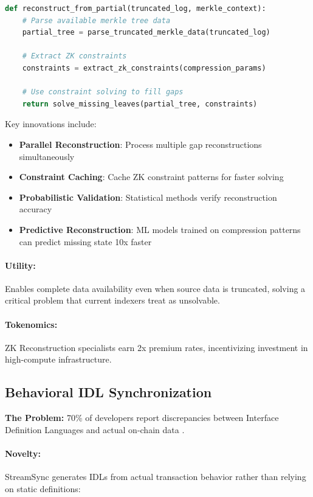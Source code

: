 \documentclass[12pt,a4paper]{article}
\begin{document}
\begin{lstlisting}[language=Python, caption=State Reconstruction Algorithm]
def reconstruct_from_partial(truncated_log, merkle_context):
    # Parse available merkle tree data
    partial_tree = parse_truncated_merkle_data(truncated_log)

    # Extract ZK constraints
    constraints = extract_zk_constraints(compression_params)

    # Use constraint solving to fill gaps
    return solve_missing_leaves(partial_tree, constraints)
\end{lstlisting}

Key innovations include:
\begin{itemize}
    \item \textbf{Parallel Reconstruction}: Process multiple gap reconstructions simultaneously
    \item \textbf{Constraint Caching}: Cache ZK constraint patterns for faster solving
    \item \textbf{Probabilistic Validation}: Statistical methods verify reconstruction accuracy
    \item \textbf{Predictive Reconstruction}: ML models trained on compression patterns can predict missing state 10x faster
\end{itemize}

\paragraph{Utility:} Enables complete data availability even when source data is truncated, solving a critical problem that current indexers treat as unsolvable.

\paragraph{Tokenomics:} ZK Reconstruction specialists earn 2x premium rates, incentivizing investment in high-compute infrastructure.

\subsection{Behavioral IDL Synchronization}

\textbf{The Problem:} 70\% of developers report discrepancies between Interface Definition Languages and actual on-chain data \cite{electriccapital2024}.

\paragraph{Novelty:} StreamSync generates IDLs from actual transaction behavior rather than relying on static definitions:
\end{document}
